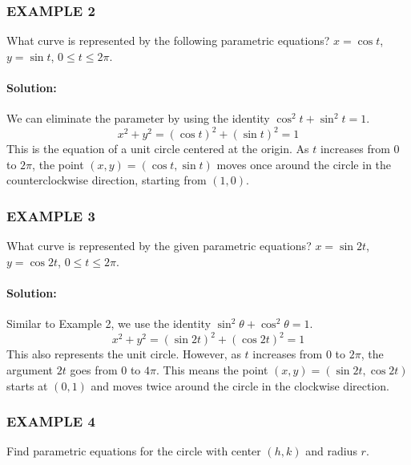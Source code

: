\documentclass{article}
\begin{document}
\subsubsection*{EXAMPLE 2}
What curve is represented by the following parametric equations? $x=\cos t$, $y=\sin t$, $0 \le t \le 2\pi$.

\paragraph{Solution:} We can eliminate the parameter by using the identity $\cos^2 t + \sin^2 t = 1$.
\[
x^2 + y^2 = (\cos t)^2 + (\sin t)^2 = 1
\]
This is the equation of a unit circle centered at the origin. As $t$ increases from $0$ to $2\pi$, the point $(x,y)=(\cos t, \sin t)$ moves once around the circle in the counterclockwise direction, starting from $(1,0)$.

\subsubsection*{EXAMPLE 3}
What curve is represented by the given parametric equations? $x=\sin 2t$, $y=\cos 2t$, $0 \le t \le 2\pi$.

\paragraph{Solution:} Similar to Example 2, we use the identity $\sin^2\theta + \cos^2\theta = 1$.
\[
x^2 + y^2 = (\sin 2t)^2 + (\cos 2t)^2 = 1
\]
This also represents the unit circle. However, as $t$ increases from $0$ to $2\pi$, the argument $2t$ goes from $0$ to $4\pi$. This means the point $(x,y)=(\sin 2t, \cos 2t)$ starts at $(0,1)$ and moves twice around the circle in the clockwise direction.

\subsubsection*{EXAMPLE 4}
Find parametric equations for the circle with center $(h,k)$ and radius $r$.
\end{document}
